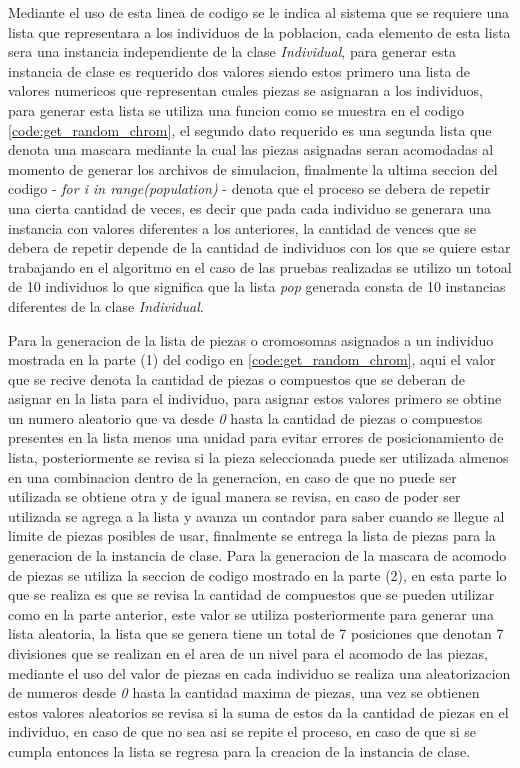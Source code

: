 Mediante el uso de esta linea de codigo se le indica al sistema que se requiere
una lista que representara a los individuos de la poblacion, cada elemento de
esta lista sera una instancia independiente de la clase \textit{Individual},
para generar esta instancia de clase es requerido dos valores siendo estos
primero una lista de valores numericos que representan cuales piezas se
asignaran a los individuos, para generar esta lista se utiliza una funcion como
se muestra en el codigo \ref{code:get_random_chrom}, el segundo dato requerido
es una segunda lista que denota una mascara mediante la cual las piezas
asignadas seran acomodadas al momento de generar los archivos de simulacion,
finalmente la ultima seccion del codigo - \textit{for i in range(population)} -
denota que el proceso se debera de repetir una cierta cantidad de veces, es
decir que pada cada individuo se generara una instancia con valores diferentes a
los anteriores, la cantidad de vences que se debera de repetir depende de la
cantidad de individuos con los que se quiere estar trabajando en el algoritmo en
el caso de las pruebas realizadas se utilizo un totoal de 10 individuos lo que
significa que la lista \textit{pop} generada consta de 10 instancias diferentes
de la clase \textit{Individual}. 

Para la generacion de la lista de piezas o cromosomas asignados a un individuo
mostrada en la parte (1) del codigo en \ref{code:get_random_chrom}, aqui el
valor que se recive denota la cantidad de piezas o compuestos que se deberan de
asignar en la lista para el individuo, para asignar estos valores primero se
obtine un numero aleatorio que va desde \textit{0} hasta la cantidad de piezas o
compuestos presentes en la lista menos una unidad para evitar errores de
posicionamiento de lista, posteriormente se revisa si la pieza seleccionada
puede ser utilizada almenos en una combinacion dentro de la generacion, en caso
de que no puede ser utilizada se obtiene otra y de igual manera se revisa, en
caso de poder ser utilizada se agrega a la lista y avanza un contador para saber
cuando se llegue al limite de piezas posibles de usar, finalmente se entrega la
lista de piezas para la generacion de la instancia de clase. Para la generacion
de la mascara de acomodo de piezas se utiliza la seccion de codigo mostrado en
la parte (2), en esta parte lo que se realiza es que se revisa la cantidad de
compuestos que se pueden utilizar como en la parte anterior, este valor se
utiliza posteriormente para generar una lista aleatoria, la lista que se genera
tiene un total de 7 posiciones que denotan 7 divisiones que se realizan en el
area de un nivel para el acomodo de las piezas, mediante el uso del valor de
piezas en cada individuo se realiza una aleatorizacion de numeros desde
\textit{0} hasta la cantidad maxima de piezas, una vez se obtienen estos valores
aleatorios se revisa si la suma de estos da la cantidad de piezas en el
individuo, en caso de que no sea asi se repite el proceso, en caso de que si se
cumpla entonces la lista se regresa para la creacion de la instancia de clase.

